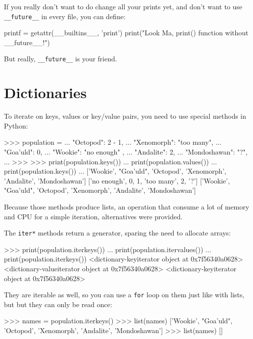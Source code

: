 If you really don't want to do change all your prints yet, and don't want to use \lstinline{__future__} in every file, you can define:

\begin{py}
printf = getattr(__builtins__, 'print')
print("Look Ma, print() function without __future__!")
\end{py}

But really, \lstinline{__future__} is your friend.

\section{Dictionaries}

To iterate on keys, values or key/value pairs, you need to use special methods in Python:

\begin{py}
>>> population = {
...     "Octopod": 2 - 1,
...     "Xenomorph": "too many",
...     "Goa'uld": 0,
...     "Wookie": "no enough" ,
...     "Andalite": 2,
...     "Mondoshawan": "?",
... }
>>>
>>> print(population.keys())
... print(population.values())
... print(population.keys())
...
['Wookie', "Goa'uld", 'Octopod', 'Xenomorph', 'Andalite', 'Mondoshawan']
['no enough', 0, 1, 'too many', 2, '?']
['Wookie', "Goa'uld", 'Octopod', 'Xenomorph', 'Andalite', 'Mondoshawan']
\end{py}

Because those methods produce lists, an operation that consume a lot of memory and CPU for a simple iteration, alternatives were provided.

The \lstinline{iter*} methods return a generator, sparing the need to allocate arrays:

\begin{py}
>>> print(population.iterkeys())
... print(population.itervalues())
... print(population.iterkeys())
<dictionary-keyiterator object at 0x7f56340a0628>
<dictionary-valueiterator object at 0x7f56340a0628>
<dictionary-keyiterator object at 0x7f56340a0628>
\end{py}

They are iterable as well, so you can use a \lstinline{for} loop on them just like with lists, but but they can only be read once:

\begin{py}
>>> names = population.iterkeys()
>>> list(names)
['Wookie', "Goa'uld", 'Octopod', 'Xenomorph', 'Andalite', 'Mondoshawan']
>>> list(names)
[]
\end{py}

